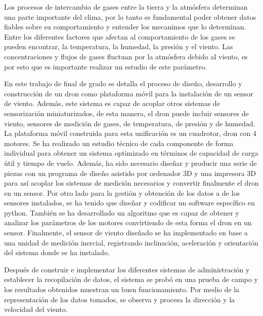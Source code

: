 
Los procesos de intercambio de gases entre la tierra y la atmósfera determinan una parte importante del clima, por lo tanto es fundamental poder obtener datos fiables sobre su comportamiento y entender los mecanimos que lo determinan. Entre los diferentes factores que afectan al comportamiento de los gases se pueden encontrar, la temperatura, la humedad, la presión y el viento. Las concentraciones y flujos de gases fluctuan por la atmósfera debido al viento, es por esto que es importante realizar un estudio de este parámetro.

En este trabajo de final de grado se detalla el proceso de diseño, desarrollo y construcción de un dron como plataforma móvil para la instalación de un sensor de viento. Además, este sistema es capaz de  acoplar otros sistemas de sensorización miniaturizados, de esta manera, el dron puede incluir sensores de viento, sensores de medición de gases, de temperatura, de presión y de humedad. La plataforma móvil construida para esta unificación es un cuadrotor, dron con 4 motores. Se ha realizado un estudio técnico de cada componente de forma individual para obtener un sistema optimizado en términos de capacidad de carga útil y tiempo de vuelo. Además, ha sido necesario diseñar y producir una serie de piezas con un programa de diseño asistido por ordenador 3D y una impresora 3D para así acoplar los sistemas de medición necesarios y convertir finalmente el dron en un sensor. Por otro lado para la gestión y obtención de los datos a de los sensores instalados, se ha tenido que diseñar y codificar un software específico en python. También se ha desarrollado un algoritmo que es capaz de obtener y analizar los parámetros de los motores convirtiendo de esta forma el dron en un sensor. Finalmente, el sensor de viento diseñado se ha implementado en base a una unidad de medición inercial, registrando inclinación, aceleración y orientación del sistema donde se ha instalado.

Después de construir e implementar los diferentes sistemas de administración y establecer la recopilación de datos, el sistema se probó en una prueba de campo y los resultados obtenidos muestran un buen funcionamiento. Por medio de la representación de los datos tomados, se observa y procesa la dirección y la velocidad del viento.